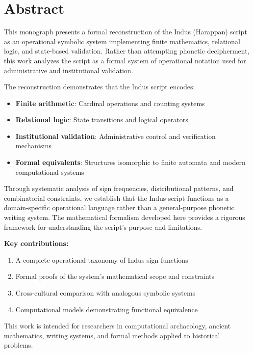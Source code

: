 \chapter*{Abstract}

This monograph presents a formal reconstruction of the Indus (Harappan) script as an operational symbolic system implementing finite mathematics, relational logic, and state-based validation. Rather than attempting phonetic decipherment, this work analyzes the script as a formal system of operational notation used for administrative and institutional validation.

The reconstruction demonstrates that the Indus script encodes:
\begin{itemize}
    \item \textbf{Finite arithmetic}: Cardinal operations and counting systems
    \item \textbf{Relational logic}: State transitions and logical operators
    \item \textbf{Institutional validation}: Administrative control and verification mechanisms
    \item \textbf{Formal equivalents}: Structures isomorphic to finite automata and modern computational systems
\end{itemize}

Through systematic analysis of sign frequencies, distributional patterns, and combinatorial constraints, we establish that the Indus script functions as a domain-specific operational language rather than a general-purpose phonetic writing system. The mathematical formalism developed here provides a rigorous framework for understanding the script's purpose and limitations.

\textbf{Key contributions:}
\begin{enumerate}
    \item A complete operational taxonomy of Indus sign functions
    \item Formal proofs of the system's mathematical scope and constraints
    \item Cross-cultural comparison with analogous symbolic systems
    \item Computational models demonstrating functional equivalence
\end{enumerate}

This work is intended for researchers in computational archaeology, ancient mathematics, writing systems, and formal methods applied to historical problems.
